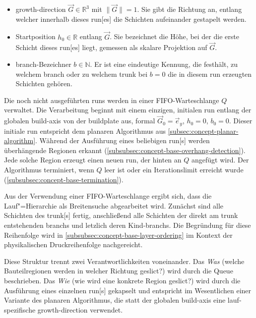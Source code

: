                 \begin{itemize}
                    \item \Gls{growth-direction} $\vec{G} \in \mathbb{R}^3$ mit $\lVert\vec{G}\rVert = 1$. Sie gibt die Richtung an, entlang welcher innerhalb dieses \gls{run}[es] die Schichten aufeinander gestapelt werden.
                    \item Startposition $h_0 \in \mathbb{R}$ entlang $\vec{G}$. Sie bezeichnet die Höhe, bei der die erste Schicht dieses \gls{run}[es] liegt, gemessen als skalare Projektion auf $\vec{G}$.
                    \item \Gls{branch}-Bezeichner $b \in \mathbb{N}$. Er ist eine eindeutige Kennung, die festhält, zu welchem \gls{branch} oder zu welchem \gls{trunk} bei $b=0$ die in diesem \gls{run} erzeugten Schichten gehören.
                \end{itemize}

                Die noch nicht ausgeführten \glspl{run} werden in einer \ac{FIFO}-Warteschlange $Q$ verwaltet.
                Die Verarbeitung beginnt mit einem einzigen, initialen \gls{run} entlang der globalen \gls{build-axis} von der \gls{buildplate} aus, formal $\vec{G}_0 = \vec{e}_y$, $h_0 = 0$, $b_0 = 0$.
                Dieser initiale \gls{run} entspricht dem planaren Algorithmus aus \cref{subsec:concept-planar-algorithm}.
                Während der Ausführung eines beliebigen \gls{run}[s] werden überhängende Regionen erkannt (\cref{subsubsec:concept-base-overhang-detection}).
                Jede solche Region erzeugt einen neuen \gls{run}, der hinten an $Q$ angefügt wird.
                Der Algorithmus terminiert, wenn $Q$ leer ist oder ein Iterationslimit erreicht wurde (\cref{subsubsec:concept-base-termination}). 

                Aus der Verwendung einer \ac{FIFO}-Warteschlange ergibt sich, dass die Lauf"=Hierarchie als Breitensuche abgearbeitet wird.
                Zunächst sind alle Schichten des \gls{trunk}[s] fertig, anschließend alle Schichten der direkt am \gls{trunk} entstehenden \glspl{branch} und letzlich deren Kind-\glspl{branch}.
                Die Begründung für diese Reihenfolge wird in \cref{subsubsec:concept-base-layer-ordering} im Kontext der physikalischen Druckreihenfolge nachgereicht.

                Diese Struktur trennt zwei Verantwortlichkeiten voneinander.
                Das \emph{Was} (welche Bauteilregionen werden in welcher Richtung geslict?) wird durch die Queue beschrieben.
                Das \emph{Wie} (wie wird eine konkrete Region geslict?) wird durch die Ausführung eines einzelnen \gls{run}[s] gekapselt und entspricht im Wesentlichen einer Variante des planaren Algorithmus, die statt der globalen \gls{build-axis} eine lauf­spezifische \gls{growth-direction} verwendet.

